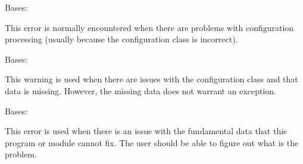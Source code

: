 \documentclass[letterpaper,10pt,english]{sphinxmanual}
\begin{document}
\begin{fulllineitems}
\label{\detokenize{python_docstrings/IfA_Smeargle.meta.errors:IfA_Smeargle.meta.errors.ConfigurationError}}
Bases: {\hyperref[\detokenize{python_docstrings/IfA_Smeargle.meta.errors:IfA_Smeargle.meta.errors.Smeargle_Exception}]{}}

This error is normally encountered when there are problems with
configuration processing (usually because the configuration class is
incorrect).

\end{fulllineitems}


\begin{fulllineitems}
\label{\detokenize{python_docstrings/IfA_Smeargle.meta.errors:IfA_Smeargle.meta.errors.ConfigurationWarning}}
Bases: {\hyperref[\detokenize{python_docstrings/IfA_Smeargle.meta.errors:IfA_Smeargle.meta.errors.Smeargle_Warning}]{}}

This warning is used when there are issues with the configuration class
and that data is missing. However, the missing data does not warrant an
exception.

\end{fulllineitems}


\begin{fulllineitems}
\label{\detokenize{python_docstrings/IfA_Smeargle.meta.errors:IfA_Smeargle.meta.errors.DataError}}
Bases: {\hyperref[\detokenize{python_docstrings/IfA_Smeargle.meta.errors:IfA_Smeargle.meta.errors.Smeargle_Exception}]{}}

This error is used when there is an issue with the fundamental data that
this program or module cannot fix. The user should be able to figure out
what is the problem.

\end{fulllineitems}
\end{document}
